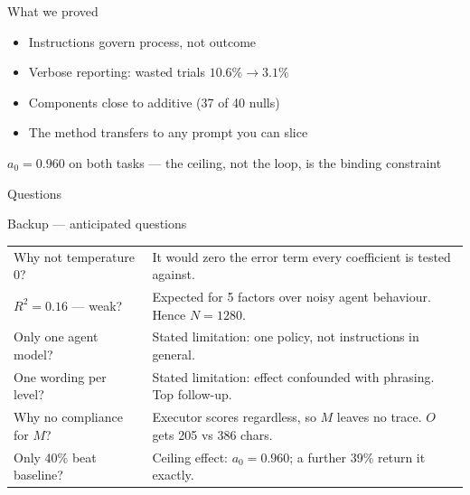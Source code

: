 \documentclass[aspectratio=169,11pt]{beamer}
\begin{document}
\begin{frame}{What we proved}
\vfill
\begin{itemize}
  \item Instructions govern \alert{process}, not outcome
  \item Verbose reporting: wasted trials $10.6\% \to 3.1\%$
  \item Components close to additive (37 of 40 nulls)
  \item The method transfers to any prompt you can slice
\end{itemize}
\vfill
\begin{center}\small
$a_0 = 0.960$ on both tasks --- the ceiling, not the loop, is the binding constraint
\end{center}
\end{frame}

\appendix
\begin{frame}[standout]Questions\end{frame}

\begin{frame}{Backup --- anticipated questions}
\footnotesize
\begin{tabular}{@{}p{4.6cm}p{7.4cm}@{}}
\toprule
Why not temperature 0? & It would zero the error term every coefficient is tested against.\\
$R^2 = 0.16$ --- weak? & Expected for 5 factors over noisy agent behaviour. Hence $N=1280$.\\
Only one agent model? & Stated limitation: one policy, not instructions in general.\\
One wording per level? & Stated limitation: effect confounded with phrasing. Top follow-up.\\
Why no compliance for $M$? & Executor scores regardless, so $M$ leaves no trace. $O$ gets 205 vs 386 chars.\\
Only 40\% beat baseline? & Ceiling effect: $a_0=0.960$; a further 39\% return it exactly.\\
\bottomrule
\end{tabular}
\end{frame}
\end{document}
